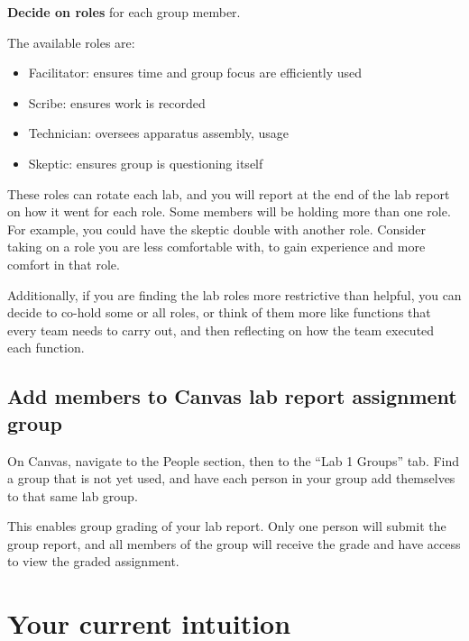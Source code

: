 \begin{steps}
	\item \textbf{Decide on roles} for each group member.
\end{steps}

The available roles are:
\begin{itemize}
	\item Facilitator: ensures time and group focus are efficiently used
	\item Scribe: ensures work is recorded
	\item Technician: oversees apparatus assembly, usage
	\item Skeptic: ensures group is questioning itself
\end{itemize}

These roles can rotate each lab, and you will report at the end of the lab report on how it went for each role. Some members will be holding more than one role. For example, you could have the skeptic double with another role. Consider taking on a role you are less comfortable with, to gain experience and more comfort in that role.

Additionally, if you are finding the lab roles more restrictive than helpful, you can decide to co-hold some or all roles, or think of them more like functions that every team needs to carry out, and then reflecting on how the team executed each function.

\subsection{Add members to Canvas lab report assignment group}

\begin{steps}
	\item On Canvas, navigate to the People section, then to the ``Lab 1 Groups'' tab. Find a group that is not yet used, and have each person in your group add themselves to that same lab group.
\end{steps}

This enables group grading of your lab report. Only one person will submit the group report, and all members of the group will receive the grade and have access to view the graded assignment.

\section{Your current intuition}\label{se:sec:intuition}

